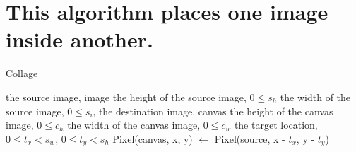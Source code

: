 \documentclass{../../../fal_assignment}
\begin{document}
\section{This algorithm places one image inside another.}
\begin{algorithm}[ht]
	\caption{Collage}
	\label{alg:algorithm}
	
	\begin{algorithmic}[1]
		\Require
		\Statex the source image, image
		\Statex the height of the source image, $0 \leq s_h$
		\Statex the width of the source image, $0 \leq s_w$
		\Statex the destination image, canvas
		\Statex the height of the canvas image, $0 \leq c_h$
		\Statex the width of the canvas image, $0 \leq c_w$
		\Statex the target location, $0 \leq t_x < s_w$, $0 \leq t_y < s_h$
			\State Pixel(canvas, x, y)  $\leftarrow$ Pixel(source, x - $t_x$,  y - $t_y$)
			\EndIf
			\EndIf
			\EndFor
		\EndProcedure
	\end{algorithmic}
	
\end{algorithm}
	
\end{document}
